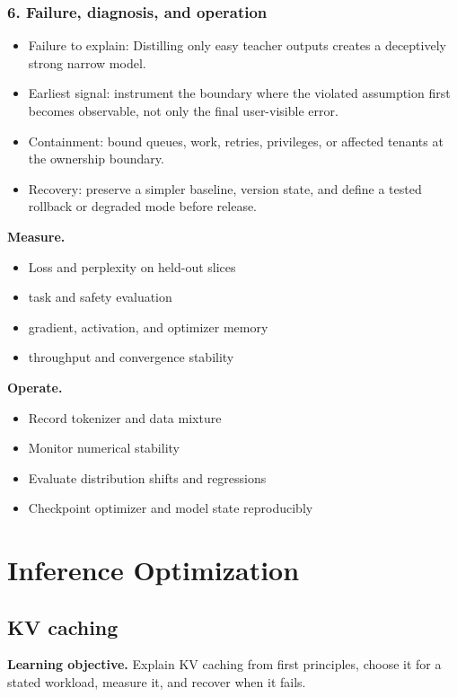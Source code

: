 \subsubsection*{6. Failure, diagnosis, and operation}
\begin{itemize}
\item Failure to explain: Distilling only easy teacher outputs creates a deceptively strong narrow model.
\item Earliest signal: instrument the boundary where the violated assumption first becomes observable, not only the final user-visible error.
\item Containment: bound queues, work, retries, privileges, or affected tenants at the ownership boundary.
\item Recovery: preserve a simpler baseline, version state, and define a tested rollback or degraded mode before release.
\end{itemize}
\textbf{Measure.}\begin{itemize}
\item Loss and perplexity on held-out slices
\item task and safety evaluation
\item gradient, activation, and optimizer memory
\item throughput and convergence stability
\end{itemize}
\textbf{Operate.}\begin{itemize}
\item Record tokenizer and data mixture
\item Monitor numerical stability
\item Evaluate distribution shifts and regressions
\item Checkpoint optimizer and model state reproducibly
\end{itemize}
\clearpage\section{Inference Optimization}
\subsection{KV caching}
\textbf{Learning objective.} Explain KV caching from first principles, choose it for a stated workload, measure it, and recover when it fails.
